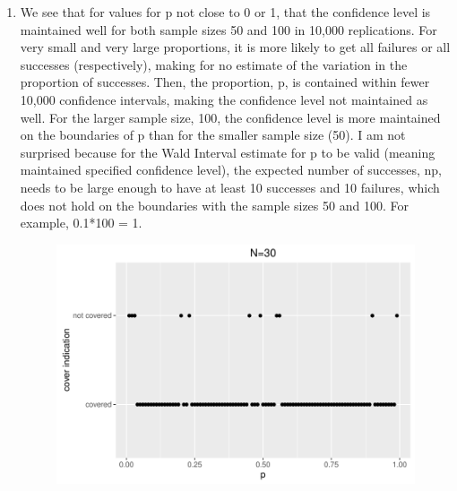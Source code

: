 \documentclass{article}\usepackage[]{graphicx}\usepackage[]{color}
\makeatletter
\def\maxwidth{ %
  \ifdim\Gin@nat@width>\linewidth
    \linewidth
  \else
    \Gin@nat@width
  \fi
}
\newenvironment{knitrout}{}{} %
\makeatother
\begin{document}
\begin{enumerate}
\item%
We see that for values for p not close to 0 or 1, that the confidence level is maintained well for both sample sizes 50 and 100 in 10,000 replications. For very small and very large proportions, it is more likely to get all failures or all successes (respectively), making for no estimate of the variation in the proportion of successes. Then, the proportion, p, is contained within fewer 10,000 confidence intervals, making the confidence level not maintained as well. For the larger sample size, 100, the confidence level is more maintained on the boundaries of p than for the smaller sample size (50). I am not surprised because for the Wald Interval estimate for p to be valid (meaning maintained specified confidence level), the expected number of successes, np, needs to be large enough to have at least 10 successes and 10 failures, which does not hold on the boundaries with the sample sizes 50 and 100. For example, 0.1*100 = 1.



\begin{figure}[h!]
\begin{knitrout}
\color{fgcolor}

{\centering \includegraphics[width=\maxwidth]{figure/prob1_part1-1} 

}
\end{knitrout}
\end{figure}
\end{enumerate}
\end{document}
